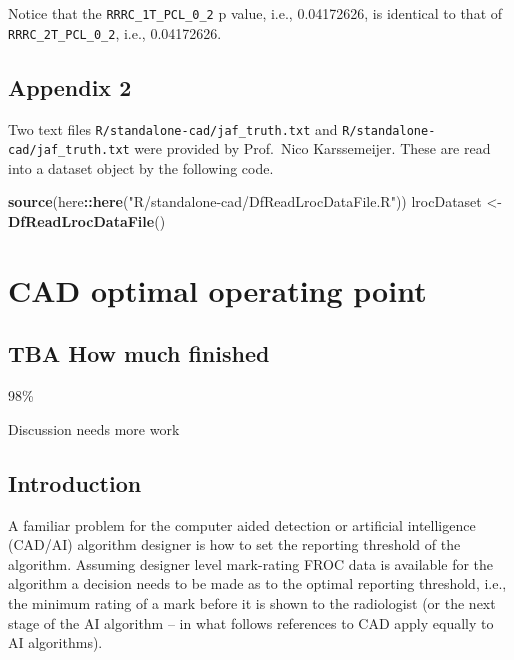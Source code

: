 \documentclass[
]{book}
\newenvironment{Shaded}{\begin{snugshade}}{\end{snugshade}}
\newcommand{\KeywordTok}[1]{\textcolor[rgb]{0.13,0.29,0.53}{\textbf{#1}}}
\newcommand{\NormalTok}[1]{#1}
\newcommand{\OperatorTok}[1]{\textcolor[rgb]{0.81,0.36,0.00}{\textbf{#1}}}
\newcommand{\StringTok}[1]{\textcolor[rgb]{0.31,0.60,0.02}{#1}}
\begin{document}
Notice that the \texttt{RRRC\_1T\_PCL\_0\_2} p value, i.e., 0.04172626, is identical to that of \texttt{RRRC\_2T\_PCL\_0\_2}, i.e., 0.04172626.

\hypertarget{standalone-cad-radiologists-appendix2}{%
\section{Appendix 2}\label{standalone-cad-radiologists-appendix2}}

Two text files \texttt{R/standalone-cad/jaf\_truth.txt} and \texttt{R/standalone-cad/jaf\_truth.txt} were provided by Prof.~Nico Karssemeijer. These are read into a dataset object by the following code.

\begin{Shaded}
\begin{Highlighting}[]
\KeywordTok{source}\NormalTok{(here}\OperatorTok{::}\KeywordTok{here}\NormalTok{(}\StringTok{"R/standalone-cad/DfReadLrocDataFile.R"}\NormalTok{))}
\NormalTok{lrocDataset <-}\StringTok{ }\KeywordTok{DfReadLrocDataFile}\NormalTok{()}
\end{Highlighting}
\end{Shaded}

\hypertarget{optim-op-point}{%
\chapter{CAD optimal operating point}\label{optim-op-point}}

\hypertarget{optim-op-point-how-much-finished}{%
\section{TBA How much finished}\label{optim-op-point-how-much-finished}}

98\%

Discussion needs more work

\hypertarget{optim-op-point-intro}{%
\section{Introduction}\label{optim-op-point-intro}}

A familiar problem for the computer aided detection or artificial intelligence (CAD/AI) algorithm designer is how to set the reporting threshold of the algorithm. Assuming designer level mark-rating FROC data is available for the algorithm a decision needs to be made as to the optimal reporting threshold, i.e., the minimum rating of a mark before it is shown to the radiologist (or the next stage of the AI algorithm -- in what follows references to CAD apply equally to AI algorithms).
\end{document}
